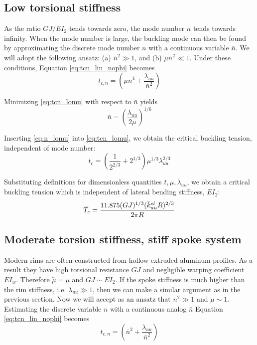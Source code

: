 \documentclass[\rootdir/thesis.tex]{subfiles}
\begin{document}
\subsection{Low torsional stiffness}
As the ratio $GJ/EI_2$ tends towards zero, the mode number $n$ tends towards infinity. When the mode number is large, the buckling mode can then be found by approximating the discrete mode number $n$ with a continuous variable $\bar{n}$. We will adopt the following ansatz: (a) $\bar{n}^2 \gg 1$, and (b) $\mu\bar{n}^2 \ll 1$. Under these conditions, Equation \eqref{eq:tcn_lin_nophi} becomes
\begin{equation}
\label{eq:tcn_lomu}
t_{c,n} = \left(\mu \bar{n}^4 + \frac{\lambda_{uu}}{\bar{n}^2}\right)
\end{equation}

Minimizing \eqref{eq:tcn_lomu} with respect to $\bar{n}$ yields
\begin{equation}
\label{eq:n_lomu}
\bar{n}=\left(\frac{\lambda_{uu}}{2\mu}\right)^{1/6}
\end{equation}

Inserting \eqref{eq:n_lomu} into \eqref{eq:tcn_lomu}, we obtain the critical buckling tension, independent of mode number:
\begin{equation}
\label{eq:tc_lomu}
t_c = \left(\frac{1}{2^{2/3}} + 2^{1/3}\right)\mu^{1/3}\lambda_{uu}^{2/3}
\end{equation}

Substituting definitions for dimensionless quantities $t,\mu,\lambda_{uu}$, we obtain a critical buckling tension which is independent of lateral bending stiffness, $EI_2$:
\begin{equation}
\bar{T}_c = \frac{11.875 (GJ)^{1/3} (\bar{k}_{uu}^{el}R)^{2/3}}{2\pi R}
\end{equation}

\subsection{Moderate torsion stiffness, stiff spoke system}
Modern rims are often constructed from hollow extruded aluminum profiles. As a result they have high torsional resistance $GJ$ and negligible warping coefficient $EI_w$. Therefore $\tilde{\mu} = \mu$ and $GJ \sim EI_2$. If the spoke stiffness is much higher than the rim stiffness, i.e. $\lambda_{uu} \gg 1$, then we can make a similar argument as in the previous section. Now we will accept as an ansatz that $n^2 \gg 1$ and $\mu \sim 1$. Estimating the discrete variable $n$ with a continuous analog $\bar{n}$ Equation \eqref{eq:tcn_lin_nophi} becomes
\begin{equation}
\label{eq:tcn_hi_k}
t_{c,n} = \left(\bar{n}^2 + \frac{\lambda_{uu}}{\bar{n}^2}\right)
\end{equation}
\end{document}

